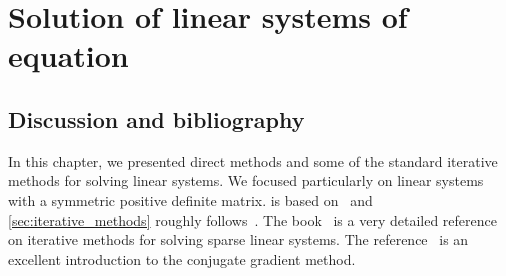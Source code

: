 \chapter{Solution of linear systems of equation}
\label{cha:solution_of_linear_systems}
\minitoc







\section{Discussion and bibliography}%

In this chapter,
we presented direct methods and some of the standard iterative methods for solving linear systems.
We focused particularly on linear systems with a symmetric positive definite matrix.
 is based on~\cite{MR2265914,Vuik}
and \cref{sec:iterative_methods} roughly follows~\cite[Chapter 2]{VanDooren}.
The book~\cite{MR1990645} is a very detailed reference on iterative methods for solving sparse linear systems.
The reference~\cite{shewchuk1994introduction} is an excellent introduction to the conjugate gradient method.
